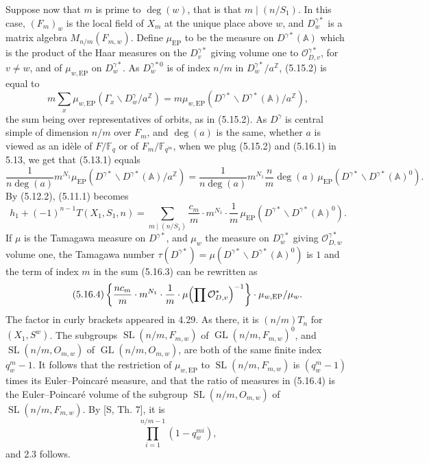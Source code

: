 \documentclass[10pt]{article}
\newcommand{\Fq}{\mathbb F_q}
\newcommand{\Fqm}{\mathbb F_{q^m}}
\newcommand{\Z}{\mathbb Z}
\newcommand{\Adele}{\mathbb A}
\newcommand{\GL}{\operatorname{GL}}
\newcommand{\SL}{\operatorname{SL}}
\newcommand{\degm}{\operatorname{deg}}
\theoremstyle{deligne}
\newcommand{\heading}[1]{\vspace{0.7em}\noindent{\bfseries #1}\quad}
\begin{document}
\heading{5.16.} Suppose now that $m$ is prime to $\degm(w)$, that is that $m\mid(n/S_1)$. In this case, $(F_m)_w$ is the local field of $X_m$ at the unique place above $w$, and $D_w^{\gamma *}$ is a matrix algebra $M_{n/m}(F_{m,w})$. Define $\mu_{\mathrm{EP}}$ to be the measure on $D^{\gamma *}(\Adele)$ which is the product of the Haar measures on the $D_v^{\gamma *}$ giving volume one to $\mathcal O_{D,v}^{\gamma *}$, for $v\ne w$, and of $\mu_{w,\mathrm{EP}}$ on $D_w^{\gamma *}$. As $D_w^{\gamma *0}$ is of index $n/m$ in $D_w^{\gamma *}/a^\Z$, (5.15.2) is equal to
\begin{equation}\tag{5.16.1}
m\sum_x \mu_{w,\mathrm{EP}}(\Gamma_x\backslash D_w^\gamma/a^\Z)
=m\mu_{w,\mathrm{EP}}(D^{\gamma *}\backslash D^{\gamma *}(\Adele)/a^\Z),
\end{equation}
the sum being over representatives of orbits, as in (5.15.2). As $D^\gamma$ is central simple of dimension $n/m$ over $F_m$, and $\degm(a)$ is the same, whether $a$ is viewed as an id\`ele of $F/\Fq$ or of $F_m/\Fqm$, when we plug (5.15.2) and (5.16.1) in 5.13, we get that (5.13.1) equals
\begin{equation}\tag{5.16.2}
\frac{1}{n\degm(a)}m^{N_1}\mu_{\mathrm{EP}}(D^{\gamma *}\backslash D^{\gamma *}(\Adele)/a^\Z)
=\frac{1}{n\degm(a)}m^{N_1}\frac{n}{m}\degm(a)\,
\mu_{\mathrm{EP}}(D^{\gamma *}\backslash D^{\gamma *}(\Adele)^0).
\end{equation}
By (5.12.2), (5.11.1) becomes
\begin{equation}\tag{5.16.3}
h_1+(-1)^{n-1}T(X_1,S_1,n)
=\sum_{m\mid(n/S_1)}\frac{c_m}{m}\cdot m^{N_1}\cdot\frac1m\,
\mu_{\mathrm{EP}}(D^{\gamma *}\backslash D^{\gamma *}(\Adele)^0).
\end{equation}
If $\mu$ is the Tamagawa measure on $D^{\gamma *}$, and $\mu_w$ the measure on $D_w^{\gamma *}$ giving $\mathcal O_{D,w}^{\gamma *}$ volume one, the Tamagawa number $\tau(D^{\gamma *})=\mu(D^{\gamma *}\backslash D^{\gamma *}(\Adele)^0)$ is $1$ and the term of index $m$ in the sum (5.16.3) can be rewritten as
\begin{equation}\tag{5.16.4}
\left\{\frac{n c_m}{m}\cdot m^{N_1}\cdot\frac1m\cdot
\mu\Bigl(\prod\mathcal O_{D,v}^*\Bigr)^{-1}\right\}\cdot\mu_{w,\mathrm{EP}}/\mu_w.
\end{equation}
The factor in curly brackets appeared in 4.29. As there, it is $(n/m)T_n$ for $(X_1,S^w)$. The subgroups $\SL(n/m,F_{m,w})$ of $\GL(n/m,F_{m,w})^0$, and $\SL(n/m,O_{m,w})$ of $\GL(n/m,O_{m,w})$, are both of the same finite index $q_w^m-1$. It follows that the restriction of $\mu_{w,\mathrm{EP}}$ to $\SL(n/m,F_{m,w})$ is $(q_w^m-1)$ times its Euler--Poincar\'e measure, and that the ratio of measures in (5.16.4) is the Euler--Poincar\'e volume of the subgroup $\SL(n/m,O_{m,w})$ of $\SL(n/m,F_{m,w})$. By [S, Th. 7], it is
\[
\prod_{i=1}^{n/m-1}(1-q_w^{mi}),
\]
and 2.3 follows.
\end{document}
